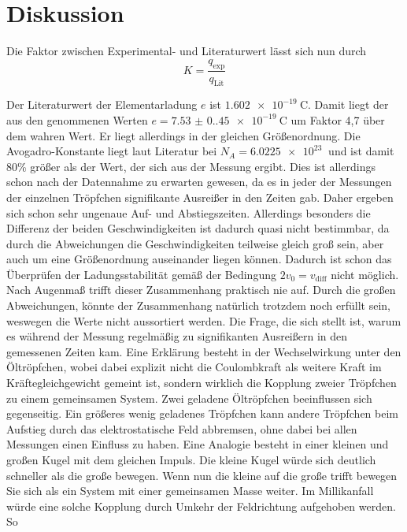 \section{Diskussion}
Die Faktor zwischen Experimental- und Literaturwert lässt sich nun durch 
\begin{equation}
    K =\frac{q_\text{exp}}{q_\text{Lit}}
\end{equation}

Der Literaturwert der Elementarladung $e$ ist $\qty{1.602e-19}{\coulomb}$\cite{PhysikTabellen}. Damit liegt der aus den genommenen Werten 
$e=\qty{7.53(0.45)e-19}{\coulomb}$ um Faktor 4,7 über dem wahren Wert. Er liegt allerdings in der gleichen Größenordnung.
Die Avogadro-Konstante liegt laut Literatur bei $N_A=\qty{6.0225e23}{}$\cite{PhysikTabellen} und ist damit 80\% größer als der Wert, der sich aus der Messung
ergibt. Dies ist allerdings schon nach der Datennahme zu erwarten gewesen, da es in jeder der Messungen der einzelnen Tröpfchen signifikante
Ausreißer in den Zeiten gab. Daher ergeben sich schon sehr ungenaue Auf- und Abstiegszeiten. Allerdings besonders die Differenz der beiden
Geschwindigkeiten ist dadurch quasi nicht bestimmbar, da durch die Abweichungen die Geschwindigkeiten teilweise gleich groß sein, aber auch um eine Größenordnung auseinander liegen können.
Dadurch ist schon das Überprüfen der Ladungsstabilität gemäß der Bedingung $2v_0=v_\text{diff}$ nicht möglich.
Nach Augenmaß trifft dieser Zusammenhang praktisch nie auf. Durch die großen Abweichungen, könnte der Zusammenhang natürlich trotzdem 
noch erfüllt sein, weswegen die Werte nicht aussortiert werden. Die Frage, die sich stellt ist, warum es während der Messung regelmäßig zu signifikanten
Ausreißern in den gemessenen Zeiten kam. Eine Erklärung besteht in der Wechselwirkung unter den Öltröpfchen, wobei dabei explizit nicht die Coulombkraft als weitere Kraft im
Kräftegleichgewicht gemeint ist, sondern wirklich die Kopplung zweier Tröpfchen zu einem gemeinsamen System. Zwei geladene Öltröpfchen
beeinflussen sich gegenseitig. Ein größeres wenig geladenes Tröpfchen kann andere Tröpfchen beim Aufstieg durch das elektrostatische Feld abbremsen,
ohne dabei bei allen Messungen einen Einfluss zu haben. Eine Analogie besteht in einer kleinen und großen Kugel mit dem gleichen Impuls. Die kleine Kugel würde sich deutlich schneller als die große bewegen.
Wenn nun die kleine auf die große trifft bewegen Sie sich als ein System mit einer gemeinsamen Masse weiter. Im Millikanfall würde eine solche Kopplung durch Umkehr der Feldrichtung aufgehoben werden. So 
